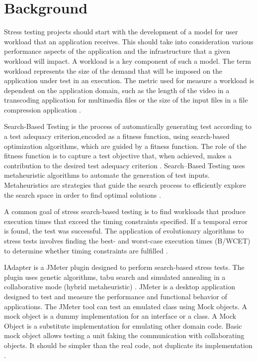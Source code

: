 
\section{Background}

Stress testing projects should start with the development of a model for user workload that an application receives. This should take into consideration various performance aspects of the application and the infrastructure that a given workload will impact. A workload is a key component of such a model. The term workload represents the size of the demand that will be imposed on the application under test in an execution. The metric  used for measure a workload is dependent on the application domain, such as the length of the video in a transcoding application for multimedia files or the size of the input files in a file compression application \cite{Molyneaux2009}. 

Search-Based Testing is the process of automatically
generating test according to a test adequacy criterion,encoded as a fitness function, using search-based optimization algorithms, which are guided by a fitness function. The role of the fitness function is to capture a test objective that, when achieved, makes a contribution to the desired test adequacy criterion . Search–Based Testing uses metaheuristic algorithms to
automate the generation of test inputs. Metaheuristics are strategies that guide the search process to efficiently explore the search space in order to find optimal solutions  \cite{Afzal2009a}.

A common goal of stress search-based testing is to find workloads that produce execution times that exceed the timing constraints specified. If a temporal error is found, the test was successful. The application of evolutionary algorithms to  stress tests involves finding the best- and worst-case execution times (B/WCET) to determine whether timing constraints are fulfilled \cite{Afzal2009a}. 

IAdapter is a JMeter plugin designed to perform search-based stress tests. The plugin uses genetic algorithms, tabu search and simulated annealing in a collaborative mode (hybrid metaheuristic) \cite{Gois2016}. JMeter is a desktop application designed to test and measure the performance and functional behavior of applications. The JMeter tool can test an emulated class using Mock objects. A mock object is a dummy implementation for an interface or a class. A Mock Object is a substitute implementation for emulating other domain code. Basic mock object allows testing a unit faking the communication with collaborating objects. It should be simpler than the real code, not duplicate its implementation \cite{Brown2003}. 



